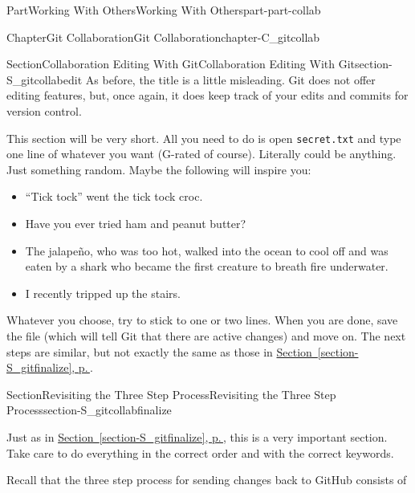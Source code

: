 \documentclass[twoside,10pt,]{book}
\newcommand{\xreffont}{\relax}
\newcommand{\mono}[1]{\texttt{#1}}
\begin{document}
\begin{partptx}{Part}{Working With Others}{}{Working With Others}{}{}{part-part-collab}
\begin{chapterptx}{Chapter}{Git Collaboration}{}{Git Collaboration}{}{}{chapter-C_gitcollab}
\typeout{************************************************}
%
\begin{sectionptx}{Section}{Collaboration Editing With Git}{}{Collaboration Editing With Git}{}{}{section-S_gitcollabedit}
%
%
As before, the title is a little misleading. Git does not offer editing features, but, once again, it does keep track of your edits and commits for version control.%
\par
This section will be very short. All you need to do is open \mono{secret.txt} and type one line of whatever you want (G-rated of course). Literally could be anything. Just something random. Maybe the following will inspire you:%
\begin{itemize}[label=\textbullet]
\item{}``Tick tock'' went the tick tock croc.%
\item{}Have you ever tried ham and peanut butter?%
\item{}The jalapeño, who was too hot, walked into the ocean to cool off and was eaten by a shark who became the first creature to breath fire underwater.%
\item{}I recently tripped up the stairs.%
\end{itemize}
%
\par
Whatever you choose, try to stick to one or two lines. When you are done, save the file (which will tell Git that there are active changes) and move on. The next steps are similar, but not exactly the same as those in \hyperref[section-S_gitfinalize]{Section~{\xreffont\ref{section-S_gitfinalize}}, p.\,\pageref{section-S_gitfinalize}}.%
\end{sectionptx}
%
%
\typeout{************************************************}
\typeout{************************************************}
%
\begin{sectionptx}{Section}{Revisiting the Three Step Process}{}{Revisiting the Three Step Process}{}{}{section-S_gitcollabfinalize}
%
%
\begin{introduction}{}%
Just as in \hyperref[section-S_gitfinalize]{Section~{\xreffont\ref{section-S_gitfinalize}}, p.\,\pageref{section-S_gitfinalize}}, this is a very important section. Take care to do everything in the correct order and with the correct keywords.%
\par
Recall that the three step process for sending changes back to GitHub consists of%

\end{introduction}
\end{sectionptx}
\end{chapterptx}
\end{partptx}
\end{document}
